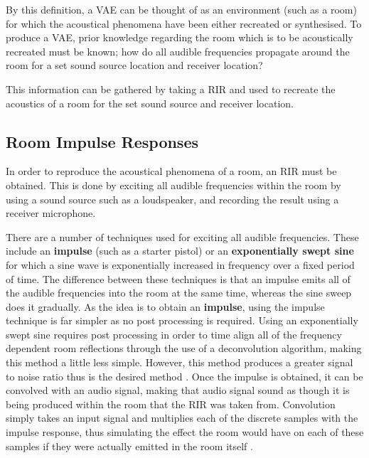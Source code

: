 \documentclass[../../main.tex]{subfiles}
\begin{document}
		By this definition, a \ac{VAE} can be thought of as an environment (such as a room) for which the acoustical phenomena have been either recreated or synthesised. To produce a \ac{VAE}, prior knowledge regarding the room which is to be acoustically recreated must be known; how do all audible frequencies propagate around the room for a set sound source location and receiver location?

		This information can be gathered by taking a \ac{RIR} and used to recreate the acoustics of a room for the set sound source and receiver location.

	\subsection{Room Impulse Responses}

		In order to reproduce the acoustical phenomena of a room, an \ac{RIR} must be obtained. This is done by exciting all audible frequencies within the room by using a sound source such as a loudspeaker, and recording the result using a receiver microphone.

		There are a number of techniques used for exciting all audible frequencies. These include an \textbf{impulse} (such as a starter pistol) or an \textbf{exponentially swept sine} for which a sine wave is exponentially increased in frequency over a fixed period of time. The difference between these techniques is that an impulse emits all of the audible frequencies into the room at the same time, whereas the sine sweep does it gradually. As the idea is to obtain an \textbf{impulse}, using the impulse technique is far simpler as no post processing is required. Using an exponentially swept sine requires post processing in order to time align all of the frequency dependent room reflections through the use of a deconvolution algorithm, making this method a little less simple. However, this method produces a greater signal to noise ratio thus is the desired method \cite{Stan2002}. Once the impulse is obtained, it can be convolved with an audio signal, making that audio signal sound as though it is being produced within the room that the \ac{RIR} was taken from. Convolution simply takes an input signal and multiplies each of the discrete samples with the impulse response, thus simulating the effect the room would have on each of these samples if they were actually emitted in the room itself \cite{Smith2003}.

\end{document}
